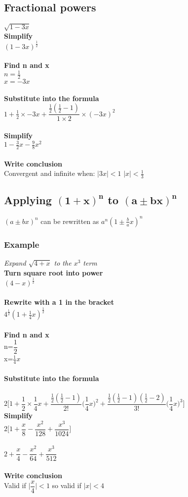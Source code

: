 \documentclass{article}[18pt]
\begin{document}
\subsection{Fractional powers}
$\sqrt{1-3x}$\\
\textbf{Simplify}\\
$(1-3x)^{\frac{1}{2}}$\\
\\
\textbf{Find n and x}\\
$n=\frac{1}{2}$\\
$x=-3x$\\
\\
\textbf{Substitute into the formula}\\
$1+\frac{1}{2}\times-3x+\dfrac{\frac{1}{2}(\frac{1}{2}-1)}{1\times2}\times(-3x)^2$\\
\\
\textbf{Simplify}\\
$1-\frac{3}{2}x-\frac{9}{8}x^2$\\
\\
\textbf{Write conclusion}\\
Convergent and infinite when:
$|3x|<1$ $|x|<\frac{1}{3}$
\subsection{Applying $\mathbf{(1+x)^n}$ to $\mathbf{(a\pm bx)^n}$}
$(a\pm bx)^n$ can be rewritten as $a^n(1\pm\frac{b}{a}x)^n$
\subsubsection{Example}
\textit{Expand $\sqrt{4+x}$ to the $x^3$ term}\\
\textbf{Turn square root into power}\\
$(4-x)^{\frac{1}{2}}$\\
\\
\textbf{Rewrite with a 1 in the bracket}\\
$4^{\frac{1}{2}}(1+\frac{1}{4}x)^\frac{1}{2}$\\
\\
\textbf{Find n and x}\\
n=$\dfrac{1}{2}$\\
x=$\frac{1}{4}x$\\
\\
\textbf{Substitute into the formula}\\
\\
$2\Bigg[1+\dfrac{1}{2}\times\dfrac{1}{4}x+\dfrac{\frac{1}{2}(\frac{1}{2}-1)}{2!}\Bigg(\dfrac{1}{4}x\Bigg)^2+\dfrac{\frac{1}{2}(\frac{1}{2}-1)(\frac{1}{2}-2)}{3!}\Bigg(\dfrac{1}{4}x\Bigg)^3\Bigg]$
\\
\textbf{Simplify}\\
$2\Bigg[1+\dfrac{x}{8}-\dfrac{x^2}{128}+\dfrac{x^3}{1024}\Bigg]$\\
\\
$2+\dfrac{x}{4}-\dfrac{x^2}{64}+\dfrac{x^3}{512}$\\
\\
\textbf{Write conclusion}\\
Valid if $\Big|\dfrac{x}{4}\Big|<1$ so valid if $|x|<4$
\end{document}
